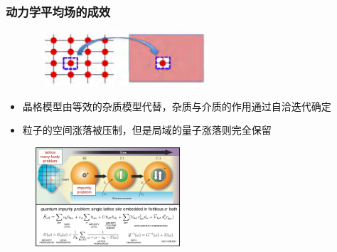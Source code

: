 \frame
{
	\frametitle{动力学平均场的成效}
\begin{figure}[h!]
\centering
\vspace{-8pt}
\includegraphics[height=0.8in,width=2.65in,viewport=0 0 1450 470,clip]{Figures/The-Dmft-site_atom-embedded.png}
\label{Dmft_site_atom-embeddded}
\end{figure}
\begin{itemize}
	\item 晶格模型由等效的杂质模型代替，杂质与介质的作用通过自洽迭代确定
	\item 粒子的空间涨落被压制，但是局域的量子涨落则完全保留
\end{itemize}
\begin{figure}[h!]
\centering
\vspace{-9pt}
\includegraphics[height=1.45in,width=2.15in,viewport=0 0 1420 985,clip]{Figures/Quantum_impurity_problem.png}
\label{Qunatum_impurity_primble}
\end{figure}
}

